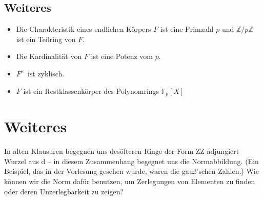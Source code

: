 \documentclass[a4paper,9pt]{scrartcl}
\begin{document}
\subsection*{Weiteres}
\begin{itemize}
	\item Die Charakteristik eines endlichen Körpers $F$ ist eine Primzahl 
          $p$ und $\mathbb{Z}/p\mathbb{Z}$ ist ein Teilring von $F$.
	\item Die Kardinalität von $F$ ist eine Potenz vom $p$.
	\item $F^\times$ ist zyklisch.
	\item $F$ ist ein Restklassenkörper des Polynomrings $\mathbb{F}_p [X]$
\end{itemize}

\section*{Weiteres}
In alten Klausuren begegnen uns desöfteren Ringe der Form ZZ adjungiert Wurzel aus d -- in diesem Zusammenhang begegnet uns die Normabbildung. (Ein Beispiel, das in der Vorlesung gesehen wurde, waren die gauß'schen Zahlen.) Wie können wir die Norm dafür benutzen, um Zerlegungen von Elementen zu finden oder deren Unzerlegbarkeit zu zeigen?
\end{document}
